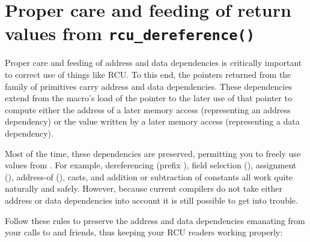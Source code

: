 \section{Proper care and feeding of return values from \texttt{rcu\_dereference()}}
\label{sec:rcu:Proper care and feeding of return values from rcu_dereference()}

Proper care and feeding of address and data dependencies is critically
important to correct use of things like RCU\@.
To this end, the pointers
returned from the  family of primitives carry address and
data dependencies.
These dependencies extend from the 
macro's load of the pointer to the later use of that pointer to compute
either the address of a later memory access (representing an address
dependency) or the value written by a later memory access (representing
a data dependency).

Most of the time, these dependencies are preserved, permitting you to
freely use values from .
For example, dereferencing
(prefix \qco{*}), field selection (\qtco{->}), assignment (\qco{=}), address-of
(\qco{&}), casts, and addition or subtraction of constants all work quite
naturally and safely.
However, because current compilers do not take
either address or data dependencies into account it is still possible
to get into trouble.

Follow these rules to preserve the address and data dependencies emanating
from your calls to  and friends, thus keeping your RCU
readers working properly:

